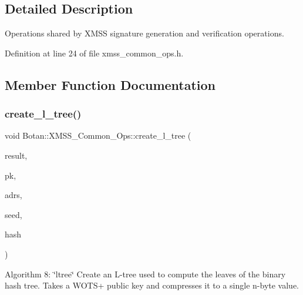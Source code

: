 \subsection{Detailed Description}
Operations shared by X\+M\+SS signature generation and verification operations. 

Definition at line 24 of file xmss\+\_\+common\+\_\+ops.\+h.



\subsection{Member Function Documentation}
\mbox{\label{class_botan_1_1_x_m_s_s___common___ops_a9c24984fc8983bab2106a3e702d02c91}} 
\subsubsection{\texorpdfstring{create\+\_\+l\+\_\+tree()}{create\_l\_tree()}\hspace{0.1cm}{\footnotesize\ttfamily [1/2]}}
{\footnotesize\ttfamily void Botan\+::\+X\+M\+S\+S\+\_\+\+Common\+\_\+\+Ops\+::create\+\_\+l\+\_\+tree (\begin{DoxyParamCaption}\item[{secure\+\_\+vector$<$ uint8\+\_\+t $>$ \&}]{result,  }\item[{wots\+\_\+keysig\+\_\+t}]{pk,  }\item[{\mbox{\hyperlink{class_botan_1_1_x_m_s_s___address}{X\+M\+S\+S\+\_\+\+Address}} \&}]{adrs,  }\item[{const secure\+\_\+vector$<$ uint8\+\_\+t $>$ \&}]{seed,  }\item[{\mbox{\hyperlink{class_botan_1_1_x_m_s_s___hash}{X\+M\+S\+S\+\_\+\+Hash}} \&}]{hash }\end{DoxyParamCaption})\hspace{0.3cm}{\ttfamily [protected]}}

Algorithm 8\+: \char`\"{}ltree\char`\"{} Create an L-\/tree used to compute the leaves of the binary hash tree. Takes a W\+O\+T\+S+ public key and compresses it to a single n-\/byte value.

